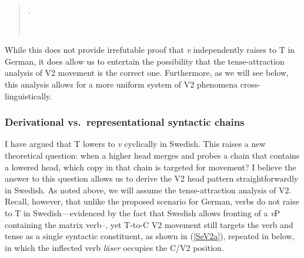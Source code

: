 \singlespacing
\begin{quote}
\begin{minipage}{5in}
\ex.

\end{minipage}\\
\end{quote}
\onehalfspacing
While this does not provide irrefutable proof that \textit{v} independently raises to T in German, it does allow us to entertain the possibility that the tense-attraction analysis of V2 movement is the correct one.\footnotemark {} Furthermore, as we will see below, this analysis allows for a more uniform system of V2 phenomena cross-linguistically.\\

\subsubsection{Derivational vs.\ representational syntactic chains}\label{deriv_rep_chains_sec}
I have argued that T lowers to {\it v} cyclically in Swedish. This raises a new theoretical question: when a higher head merges and probes a chain that contains a lowered head, which copy in that chain is targeted for movement? I believe the answer to this question allows us to derive the V2 head pattern straightforwardly in Swedish. As noted above, we will assume the tense-attraction analysis of V2. Recall, however, that unlike the proposed scenario for German, verbs do not raise to T in Swedish---evidenced by the fact that Swedish allows fronting of a {\it v}P containing the matrix verb--, yet T-to-C V2 movement still targets the verb and tense as a single syntactic constituent, as shown in (\ref{SeV2a}), repeated in \Next below, in which the inflected verb {\it l\"{a}ser} occupies the C/V2 position.

